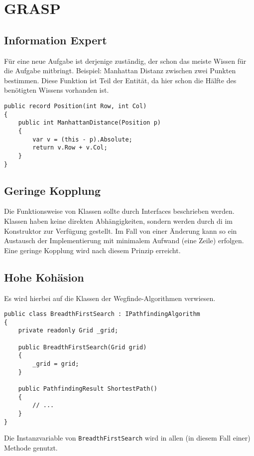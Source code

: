 \section{GRASP}
\subsection{Information Expert} \label{sec:info-expert}
Für eine neue Aufgabe ist derjenige zuständig, der schon das meiste Wissen für die Aufgabe
mitbringt. Beispiel: Manhattan Distanz zwischen zwei Punkten bestimmen.
Diese Funktion ist Teil der \ePosition{} Entität,
da hier schon die Hälfte des benötigten Wissens vorhanden ist.
\begin{lstlisting}[caption={Manhattan Distanz}]
public record Position(int Row, int Col)
{
    public int ManhattanDistance(Position p)
    {
        var v = (this - p).Absolute;
        return v.Row + v.Col;
    }
}
\end{lstlisting}

\subsection{Geringe Kopplung}
Die Funktionsweise von Klassen sollte durch Interfaces beschrieben werden.
Klassen haben keine direkten Abhängigkeiten, sondern werden durch \ac{di}
im Konstruktor zur Verfügung gestellt.
Im Fall von einer Änderung kann so ein Austausch der
Implementierung mit minimalem Aufwand (eine Zeile) erfolgen.
Eine geringe Kopplung wird nach diesem Prinzip erreicht.

\subsection{Hohe Kohäsion}
Es wird hierbei auf die Klassen der Wegfinde-Algorithmen verwiesen.
\begin{lstlisting}[caption={\lstinline{BreadthFirstSearch} Algorithmus}]
public class BreadthFirstSearch : IPathfindingAlgorithm
{
    private readonly Grid _grid;

    public BreadthFirstSearch(Grid grid)
    {
        _grid = grid;
    }

    public PathfindingResult ShortestPath()
    {
        // ...
    }
}
\end{lstlisting}
Die Instanzvariable von \lstinline{BreadthFirstSearch}
wird in allen (in diesem Fall einer) Methode genutzt.